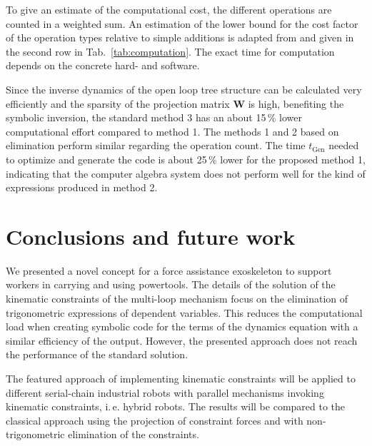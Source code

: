 \documentclass[twocolumn,10pt]{IFTOMM}
\newcommand{\bm}[1]{\boldsymbol{#1}}
\begin{document}
To give an estimate of the computational cost, the different operations are counted in a weighted sum. An estimation of the lower bound for the cost factor of the operation types relative to simple additions is adapted from \cite{Atkinson2014, Hindriksen2012} and given in the second row in Tab.\, \ref{tab:computation}.
The exact time for computation depends on the concrete hard- and software.

Since the inverse dynamics of the open loop tree structure can be calculated very efficiently and the sparsity of the projection matrix $\bm{W}$ is high, benefiting the symbolic inversion, the standard method 3 has an about 15\,\% lower computational effort compared to method 1.
The methods 1 and 2 based on elimination perform similar regarding the operation count.
The time $t_{\mathrm{Gen}}$ needed to optimize and generate the code is about 25\,\% lower for the proposed method 1, indicating that the computer algebra system does not perform well for the kind of expressions produced in method 2.


\section{Conclusions and future work}
\label{sec:conclusion}

We presented a novel concept for a force assistance exoskeleton to support workers in carrying and using powertools.
The details of the solution of the kinematic constraints of the multi-loop mechanism focus on the elimination of trigonometric expressions of dependent variables.
This reduces the computational load when creating symbolic code for the terms of the dynamics equation with a similar efficiency of the output.
However, the presented approach does not reach the performance of the standard solution.

The featured approach of implementing kinematic constraints will be applied to different serial-chain industrial robots with parallel mechanisms invoking kinematic constraints, i.\,e. hybrid robots. 
The results will be compared to the classical approach using the projection of constraint forces and with non-trigonometric elimination of the constraints.

\end{document}
